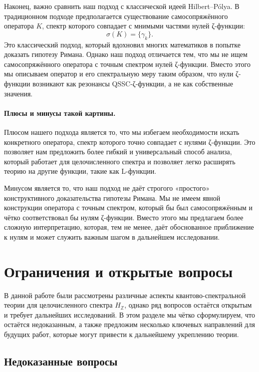 \documentclass{article}
\numberwithin{equation}{section}
\theoremstyle{plain}
\theoremstyle{definition}
\theoremstyle{remark}
\begin{document}
\noindent
Наконец, важно сравнить наш подход с классической идеей Hilbert–Pólya. В традиционном подходе предполагается существование самосопряжённого оператора \( K \), спектр которого совпадает с мнимыми частями нулей ζ-функции:
\[
\sigma(K) = \{\gamma_k\}.
\]
Это классический подход, который вдохновил многих математиков в попытке доказать гипотезу Римана. Однако наш подход отличается тем, что мы не ищем самосопряжённого оператора с точным спектром нулей ζ-функции. Вместо этого мы описываем оператор и его спектральную меру таким образом, что нули ζ-функции возникают как резонансы QSSC-ζ-функции, а не как собственные значения.

\paragraph{Плюсы и минусы такой картины.}
\noindent
Плюсом нашего подхода является то, что мы избегаем необходимости искать конкретного оператора, спектр которого точно совпадает с нулями ζ-функции. Это позволяет нам предложить более гибкий и универсальный способ анализа, который работает для целочисленного спектра и позволяет легко расширять теорию на другие функции, такие как L-функции.

Минусом является то, что наш подход не даёт строгого «простого» конструктивного доказательства гипотезы Римана. Мы не имеем явной конструкции оператора с точным спектром, который бы был самосопряжённым и чётко соответствовал бы нулям ζ-функции. Вместо этого мы предлагаем более сложную интерпретацию, которая, тем не менее, даёт обоснованное приближение к нулям и может служить важным шагом в дальнейшем исследовании.
\clearpage



\section{Ограничения и открытые вопросы}
\label{sec:limitations}

\noindent
В данной работе были рассмотрены различные аспекты квантово-спектральной теории для целочисленного спектра \( H_{\mathbb{Z}} \), однако ряд вопросов остаётся открытым и требует дальнейших исследований. В этом разделе мы чётко сформулируем, что остаётся недоказанным, а также предложим несколько ключевых направлений для будущих работ, которые могут привести к дальнейшему укреплению теории.

\subsection{Недоказанные вопросы}
\label{subsec:open-questions}
\end{document}
